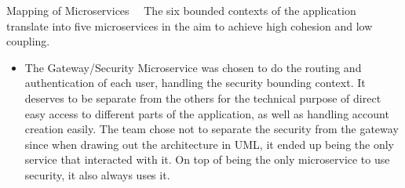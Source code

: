 \documentclass{article}
\begin{document}
\begin{section}{Mapping of Microservices }
$\quad$The six bounded contexts of the application translate into five microservices in the aim to achieve high cohesion and low coupling.
    \begin{itemize}
        \item The Gateway/Security Microservice was chosen to do the routing and authentication of each user, handling the security bounding context. It deserves to be separate from the others for the technical purpose of direct easy access to different parts of the application, as well as handling account creation easily. The team chose not to separate the security from the gateway since when drawing out the architecture in UML, it ended up being the only service that interacted with it. On top of being the only microservice to use security, it also always uses it.


\end{itemize}
\end{section}
\end{document}

